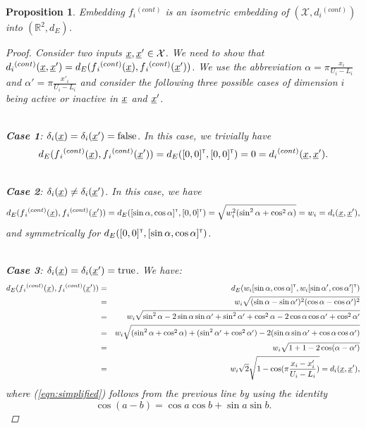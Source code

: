 \documentclass[letterpaper]{article}
\newcommand{\vect}[1]{\underline{\smash{#1}}}
\renewcommand{\v}[1]{\vect{#1}}
\newcommand{\reals}{\mathds{R}}
\newcommand\transpose{{\textrm{\tiny{\sf{T}}}}}
\newtheorem{prop}[thm]{Proposition}
\begin{document}
\begin{prop}Embedding $f{_i}^{(cont)}$ is an isometric embedding of $(\mathcal{X}, d{_i}^{(cont)})$ into $(\reals^2, d_E)$.
\label{prop:f_d_cont_isometric}
\begin{proof}
Consider two inputs $\v{x},\v{x}' \in \mathcal{X}$. We need to show that $d{_i}^{(cont)}(\v{x},\v{x}') = d_E(f{_i}^{(cont)}(\v{x}),f{_i}^{(cont)}(\v{x}'))$.
We use the abbreviation $\alpha = \pi\frac{x_i}{U_i-L_i}$ and $\alpha' = \pi\frac{x'_i}{U_i-L_i}$ and consider the following three possible cases of dimension $i$ being active or inactive in $\v{x}$ and $\v{x}'$.

~\\\noindent{}\textbf{Case 1}: $\delta_i(\v{x}) = \delta_i(\v{x}') = \textrm{false}$.
In this case, we trivially have 
\[d_E(f{_i}^{(cont)}(\v{x}),f{_i}^{(cont)}(\v{x}')) = d_E([0,0]^\transpose, [0,0]^\transpose) = 0 = d{_i}^{(cont)}(\v{x},\v{x}').\]

~\\\noindent{}\textbf{Case 2}: $\delta_i(\v{x}) \neq \delta_i(\v{x}')$. In this case, we have
\[d_E(f{_i}^{(cont)}(\v{x}),f{_i}^{(cont)}(\v{x}')) = d_E([\sin{\alpha}, \cos{\alpha}]^\transpose, [0,0]^\transpose) = \sqrt{w_i^2 (\sin^2{\alpha} + \cos^2{\alpha})} = w_i = d_i(\v{x},\v{x}'),\]
and symmetrically for $d_E([0,0]^\transpose, [\sin{\alpha}, \cos{\alpha}]^\transpose)$.

~\\\noindent{}\textbf{Case 3}: $\delta_i(\v{x}) = \delta_i(\v{x}') = \textrm{true}$. We have:
\begin{eqnarray}
\nonumber{}d_E(f{_i}^{(cont)}(\v{x}),f{_i}^{(cont)}(\v{x}')) & = & d_E(w_i [\sin{\alpha}, \cos{\alpha}]^\transpose, w_i [\sin{\alpha'}, \cos{\alpha'}]^\transpose)\\ 
\nonumber{}& = & w_i \sqrt{(\sin{\alpha}-\sin{\alpha'})^2 (\cos{\alpha}-\cos{\alpha'})^2}\\
\nonumber{}& = & w_i \sqrt{\sin^2{\alpha} -2 \sin{\alpha}\sin{\alpha'} + \sin^2{\alpha'}  + \cos^2{\alpha} -2 \cos{\alpha}\cos{\alpha'} + \cos^2{\alpha'} }\\
\nonumber{}& = & w_i \sqrt{(\sin^2{\alpha}+\cos^2{\alpha})   +  (\sin^2{\alpha'}+\cos^2{\alpha'})   -2 (\sin{\alpha}\sin{\alpha'} + \cos{\alpha}\cos{\alpha'})}\\
\label{eqn:simplified}& = & w_i \sqrt{ 1+1-2 \cos(\alpha-\alpha')}\\
\nonumber{}& = & w_i \sqrt{2} \sqrt{1 - \cos(\pi \frac{x_i-x_i'}{U_i-L_i})} = d_i(\v{x}, \v{x}'),
\end{eqnarray}
where (\ref{eqn:simplified}) follows from the previous line by using the identity 
\[\cos{(a-b)} = \cos{a}\cos{b} + \sin{a}\sin{b}.\]
\end{proof}
\end{prop}
\end{document}
